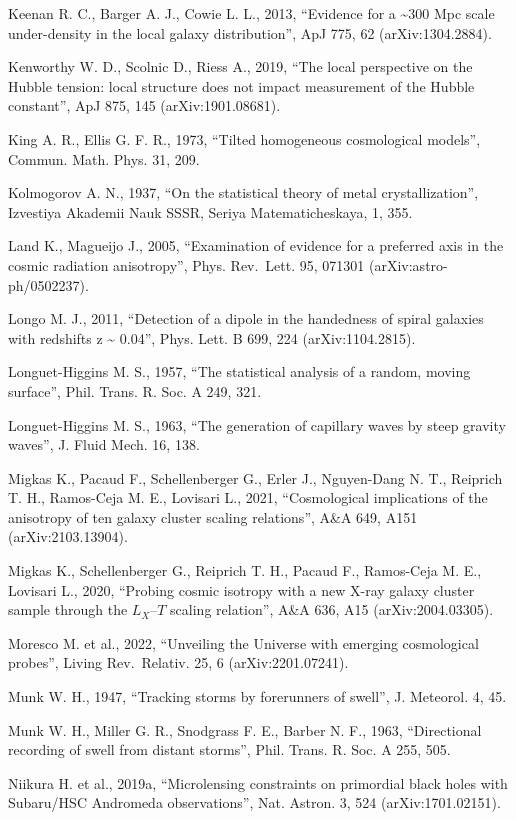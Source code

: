 \documentclass[
  11pt,
]{article}
\begin{document}
Keenan R. C., Barger A. J., Cowie L. L., 2013, ``Evidence for a
\textasciitilde300 Mpc scale under-density in the local galaxy
distribution'', ApJ 775, 62 (arXiv:1304.2884).

Kenworthy W. D., Scolnic D., Riess A., 2019, ``The local perspective on
the Hubble tension: local structure does not impact measurement of the
Hubble constant'', ApJ 875, 145 (arXiv:1901.08681).

King A. R., Ellis G. F. R., 1973, ``Tilted homogeneous cosmological
models'', Commun. Math. Phys. 31, 209.

Kolmogorov A. N., 1937, ``On the statistical theory of metal
crystallization'', Izvestiya Akademii Nauk SSSR, Seriya
Matematicheskaya, 1, 355.

Land K., Magueijo J., 2005, ``Examination of evidence for a preferred
axis in the cosmic radiation anisotropy'', Phys. Rev.~Lett. 95, 071301
(arXiv:astro-ph/0502237).

Longo M. J., 2011, ``Detection of a dipole in the handedness of spiral
galaxies with redshifts z \textasciitilde{} 0.04'', Phys. Lett. B 699,
224 (arXiv:1104.2815).

Longuet-Higgins M. S., 1957, ``The statistical analysis of a random,
moving surface'', Phil. Trans. R. Soc. A 249, 321.

Longuet-Higgins M. S., 1963, ``The generation of capillary waves by
steep gravity waves'', J. Fluid Mech. 16, 138.

Migkas K., Pacaud F., Schellenberger G., Erler J., Nguyen-Dang N. T.,
Reiprich T. H., Ramos-Ceja M. E., Lovisari L., 2021, ``Cosmological
implications of the anisotropy of ten galaxy cluster scaling
relations'', A\&A 649, A151 (arXiv:2103.13904).

Migkas K., Schellenberger G., Reiprich T. H., Pacaud F., Ramos-Ceja M.
E., Lovisari L., 2020, ``Probing cosmic isotropy with a new X-ray galaxy
cluster sample through the \(L_X\)--\(T\) scaling relation'', A\&A 636,
A15 (arXiv:2004.03305).

Moresco M. et al., 2022, ``Unveiling the Universe with emerging
cosmological probes'', Living Rev.~Relativ. 25, 6 (arXiv:2201.07241).

Munk W. H., 1947, ``Tracking storms by forerunners of swell'', J.
Meteorol. 4, 45.

Munk W. H., Miller G. R., Snodgrass F. E., Barber N. F., 1963,
``Directional recording of swell from distant storms'', Phil. Trans. R.
Soc. A 255, 505.

Niikura H. et al., 2019a, ``Microlensing constraints on primordial black
holes with Subaru/HSC Andromeda observations'', Nat. Astron. 3, 524
(arXiv:1701.02151).
\end{document}
